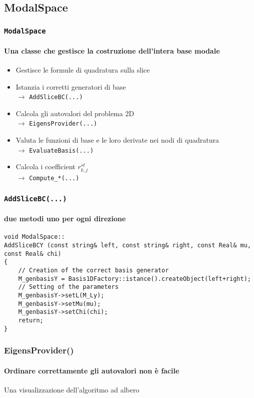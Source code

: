 \subsection{ModalSpace}
\begin{frame}
 \frametitle{\texttt{ModalSpace}}
 \framesubtitle{Una classe che gestisce la costruzione dell'intera base modale}
 \begin{itemize}
  \item Gestisce le formule di quadratura sulla slice
  \item Istanzia i corretti generatori di base\\
  $\rightarrow$ \texttt{AddSliceBC(...)}
  \item Calcola gli autovalori del problema 2D\\
  $\rightarrow$ \texttt{EigensProvider(...)}
  \item Valuta le funzioni di base e le loro derivate nei nodi di quadratura\\
  $\rightarrow$ \texttt{EvaluateBasis(...)}
  \item Calcola i coefficient $r^{st}_{k,j}$\\
  $\rightarrow$ \texttt{Compute\_*(...)}
 \end{itemize}
\end{frame}
\begin{frame}[fragile]
\frametitle{\texttt{AddSliceBC(...)}}
\framesubtitle{due metodi uno per ogni direzione}
\begin{lstlisting}[style = general]
void ModalSpace::
AddSliceBCY (const string& left, const string& right, const Real& mu, const Real& chi)
{
	// Creation of the correct basis generator
	M_genbasisY = Basis1DFactory::istance().createObject(left+right);
	// Setting of the parameters
	M_genbasisY->setL(M_Ly);
	M_genbasisY->setMu(mu);
	M_genbasisY->setChi(chi);
	return;
}
\end{lstlisting}
\end{frame}

\begin{frame}
 \frametitle{EigensProvider()}
 \framesubtitle{Ordinare correttamente gli autovalori non \`e facile}
 Una visualizzazione dell'algoritmo ad albero
\end{frame}


